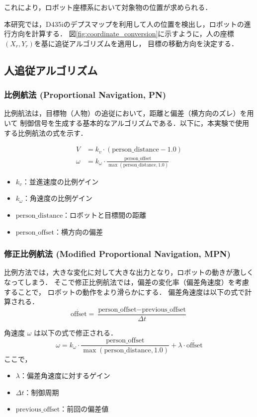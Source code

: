 これにより，ロボット座標系において対象物の位置が求められる．

本研究では，D435iのデプスマップを利用して人の位置を検出し，ロボットの進行方向を計算する．
図\ref{fig:coordinate_conversion}に示すように，人の座標$(X_r, Y_r)$を基に追従アルゴリズムを適用し，
目標の移動方向を決定する．

\subsection{人追従アルゴリズム}

\subsubsection{比例航法 (Proportional Navigation, PN)}
比例航法は，目標物（人物）の追従において，距離と偏差（横方向のズレ）を用いて
制御信号を生成する基本的なアルゴリズムである．以下に，本実験で使用する比例航法の式を示す．

\begin{align}
    V      & = k_v \cdot (\text{person\_distance} - 1.0)                                       \\
    \omega & = k_\omega \cdot \frac{\text{person\_offset}}{\max(\text{person\_distance}, 1.0)}
\end{align}
\begin{itemize}
    \item \(k_v\)：並進速度の比例ゲイン
    \item \(k_\omega\)：角速度の比例ゲイン
    \item \(\text{person\_distance}\)：ロボットと目標間の距離
    \item \(\text{person\_offset}\)：横方向の偏差
\end{itemize}

\subsubsection{修正比例航法 (Modified Proportional Navigation, MPN)}
比例方法では，大きな変化に対して大きな出力となり，ロボットの動きが激しくなってしまう．
そこで修正比例航法では，偏差の変化率（偏差角速度）を考慮することで，
ロボットの動作をより滑らかにする．
偏差角速度は以下の式で計算される．
\begin{equation}
    \dot{\text{offset}} = \frac{\text{person\_offset} - \text{previous\_offset}}{\Delta t}
\end{equation}

角速度 \(\omega\) は以下の式で修正される．
\begin{equation}
    \omega = k_\omega \cdot \frac{\text{person\_offset}}{\max(\text{person\_distance}, 1.0)} + \lambda \cdot \dot{\text{offset}}
\end{equation}
ここで，
\begin{itemize}
    \item \(\lambda\)：偏差角速度に対するゲイン
    \item \(\Delta t\)：制御周期
    \item \(\text{previous\_offset}\)：前回の偏差値
\end{itemize}

